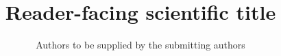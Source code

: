 \documentclass[aps,prx,reprint,groupedaddress]{revtex4-2}
\begin{document}

\title{Reader-facing scientific title}


\author{Authors to be supplied by the submitting authors}
\noaffiliation



\begin{abstract}
\end{abstract}


\maketitle
\end{document}
